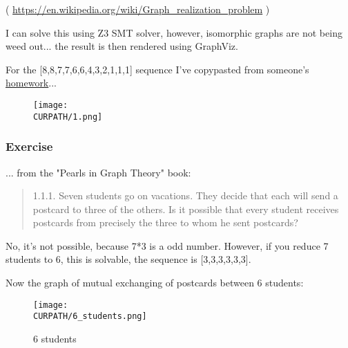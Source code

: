 ( \url{https://en.wikipedia.org/wiki/Graph_realization_problem} )

I can solve this using Z3 SMT solver, however, isomorphic graphs are not being weed out... the result is then rendered using GraphViz.



\clearpage
For the [8,8,7,7,6,6,4,3,2,1,1,1] sequence I've copypasted from someone's
\href{https://math.stackexchange.com/questions/1074651/check-if-sequence-is-graphic-8-8-7-7-6-6-4-3-2-1-1-1}{homework}...

\begin{figure}[H]
\centering
\texttt{[image: \\CURPATH/1.png]}
\end{figure}

\subsubsection{Exercise}

... from the "Pearls in Graph Theory" book:

\begin{framed}
\begin{quotation}
1.1.1. Seven students go on vacations. They decide that each will send a postcard to three of the others.
Is it possible that every student receives postcards from precisely the three to whom he sent postcards?
\end{quotation}
\end{framed}

No, it's not possible, because 7*3 is a odd number.
However, if you reduce 7 students to 6, this is solvable, the sequence is [3,3,3,3,3,3].

Now the graph of mutual exchanging of postcards between 6 students:

\begin{figure}[H]
\centering
\texttt{[image: \\CURPATH/6\_students.png]}
\caption{6 students}
\end{figure}

